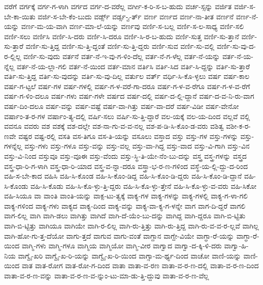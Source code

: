 {ವರೆಗೆ
ವರ್ಗಕ್ಕೆ
ವರ್ಗ-ಗ-ಳಾಗಿ
ವರ್ಗದ
ವರ್ಗ-ದ-ವರೆಲ್ಲ
ವರ್ಗೀ-ಕ-ರಿ-ಸ-ಬ-ಹುದು
ವರ್ಚ-ಸ್ಸನ್ನು
ವರ್ಜಿತ
ವರ್ಜಿ-ಸ-ಬೇ-ಕಾ-ಯಿತು
ವರ್ಜಿ-ಸ-ಬೇ-ಕೆಂ-ಬುದು
ವರ್ಡ್ಸ್
ವರ್ಡ್ಸ-್ವ-ರ್ತ್
ವರ್ಣ
ವರ್ಣದ
ವರ್ಣ-ನಾ-ತೀತ
ವರ್ಣನೆ
ವರ್ಣ-ನೆ-ಯನ್ನು
ವರ್ಣ-ಮ-ಯ-ವಾಗಿ
ವರ್ಣ-ಮಾ-ಲೆ-ಯನ್ನು
ವರ್ಣವು
ವರ್ಣಿ-ಸ-ಬಲ್ಲ
ವರ್ಣಿ-ಸ-ಲ-ಸಾಧ್ಯ
ವರ್ಣಿ-ಸಲಿ
ವರ್ಣಿ-ಸಲು
ವರ್ಣಿಸಿ
ವರ್ಣಿ-ಸಿ-ದರು
ವರ್ಣಿ-ಸಿ-ದರೂ
ವರ್ಣಿ-ಸಿ-ರ-ಬ-ಹುದು
ವರ್ಣಿ-ಸುತ್ತ
ವರ್ಣಿ-ಸು-ತ್ತಾನೆ
ವರ್ಣಿ-ಸು-ತ್ತಾರೆ
ವರ್ಣಿ-ಸು-ತ್ತಿದ್ದ
ವರ್ಣಿ-ಸು-ತ್ತಿ-ದ್ದಂತೆ
ವರ್ಣಿ-ಸು-ತ್ತಿ-ದ್ದರು
ವರ್ಣಿ-ಸುವ
ವರ್ಣಿ-ಸು-ವಲ್ಲಿ
ವರ್ಣಿ-ಸು-ವು-ದ-ರ-ಲ್ಲಿಲ್ಲ
ವರ್ಣಿ-ಸು-ವುದು
ವರ್ತನೆ
ವರ್ತ-ನೆ-ಇ-ವು-ಗ-ಳಿಂ-ದೆಲ್ಲ
ವರ್ತ-ನೆ-ಗ-ಳೆಲ್ಲ
ವರ್ತ-ನೆ-ಯನ್ನು
ವರ್ತ-ನೆ-ಯ-ನ್ನೆಲ್ಲ
ವರ್ತ-ನೆ-ಯ-ಲ್ಲಾ-ಗಲಿ
ವರ್ತ-ನೆ-ಯಿಂದ
ವರ್ತ-ಮಾನ
ವರ್ತಿಸಿ
ವರ್ತಿ-ಸಿದ
ವರ್ತಿ-ಸಿ-ದ್ದನ್ನು
ವರ್ತಿ-ಸು-ತ್ತಾರೆ
ವರ್ತಿ-ಸು-ತ್ತಿದ್ದ
ವರ್ತಿ-ಸು-ವುದನ್ನು
ವರ್ತಿ-ಸು-ವು-ದಿಲ್ಲ
ವರ್ತುಲ
ವರ್ತ್
ವರ್ಧಿ-ಸಿ-ಕೊ-ಳ್ಳಲು
ವರ್ಷ
ವರ್ಷ-ಕಾಲ
ವರ್ಷ-ಗ-ಟ್ಟಲೆ
ವರ್ಷ-ಗಳ
ವರ್ಷ-ಗಳಲ್ಲಿ
ವರ್ಷ-ಗ-ಳ-ವರೆ-ಗಾ-ದರೂ
ವರ್ಷ-ಗ-ಳ-ವ-ರೆಗೂ
ವರ್ಷ-ಗ-ಳ-ವ-ರೆಗೆ
ವರ್ಷ-ಗ-ಳಿಂ-ದಲೂ
ವರ್ಷ-ಗಳು
ವರ್ಷ-ಗಳೇ
ವರ್ಷದ
ವರ್ಷ-ದಲ್ಲಿ
ವರ್ಷ-ದ-ಲ್ಲಿ-ದ್ದಾನೆ
ವರ್ಷ-ದ-ವ-ನಿ-ರು-ವಾಗ
ವರ್ಷ-ದಿಂ-ದಲೂ
ವರ್ಷ-ವನ್ನು
ವರ್ಷ-ವಷ್ಟೆ
ವರ್ಷ-ವಾ-ಗಿತ್ತು
ವರ್ಷ-ವಾ-ದರೆ
ವರ್ಷ-ವಿಡೀ
ವರ್ಷ-ವೇನೋ
ವರ್ಷಾಂ-ತ-ರ-ಗಳ
ವರ್ಷಾಂ-ತ್ಯ-ದಲ್ಲಿ
ವರ್ಷಿ-ಸಲು
ವರ್ಷಿ-ಸು-ತ್ತಿ-ದ್ದಾರೆ
ವಲ-ಯಕ್ಕೆ
ವಲ-ಯ-ದಿಂದ
ವಲ್ಲವೆ
ವಲ್ಲಿ
ವವನೂ
ವವರು
ವಶ
ವಶಕ್ಕೆ
ವಶ-ದಲ್ಲೇ
ವಶ-ನಾ-ಗು-ವ-ವ-ನಲ್ಲ
ವಶ-ಪ-ಡಿ-ಸಿ-ಕೊಂ-ಡ-ವರು
ವಶಿತ್ವ
ವಶೀ-ಕ-ರ-ಣವೇ
ವಷ್ಟರ
ವಷ್ಟ-ರಲ್ಲಿ
ವಸತಿ
ವಸ-ತಿಗೂ
ವಸ-ತಿ-ಯನ್ನು
ವಸೂಲು
ವಸ್ತಾದ
ವಸ್ತು
ವಸ್ತು-ಗಳ
ವಸ್ತು-ಗಳನ್ನು
ವಸ್ತು-ಗಳನ್ನೆಲ್ಲ
ವಸ್ತು-ಗಳು
ವಸ್ತು-ಗಳೂ
ವಸ್ತು-ವನ್ನು
ವಸ್ತು-ವಲ್ಲ
ವಸ್ತು-ವಾ-ಗಿದ್ದ
ವಸ್ತು-ವಾದ
ವಸ್ತು-ವಿ-ಗಾಗಿ
ವಸ್ತು-ವಿನ
ವಸ್ತು-ವಿ-ನಿಂದ
ವಸ್ತುವೂ
ವಸ್ತು-ವೂಈ
ವಸ್ತು-ವೆಂದು
ವಸ್ತು-ಸ್ಥಿ-ತಿ-ಯೇ-ನೆಂ-ಬು-ದನ್ನು
ವಸ್ತ್ರ
ವಸ್ತ್ರ-ಗಳನ್ನು
ವಸ್ತ್ರದ
ವಸ್ತ್ರ-ಧಾ-ರಿ-ಗ-ಳಾಗಿ
ವಸ್ತ್ರ-ಧಾ-ರಿ-ಯಾದ
ವಸ್ತ್ರ-ವ-ನ್ನಾ-ದರೂ
ವಸ್ತ್ರಾ-ಭ-ರ-ಣ-ಗಳಿಂದ
ವಸ್ಥೆ-ಯ-ಲ್ಲಿ-ದ್ದು-ದ-ರಿಂದ
ವಹಿ-ಸ-ಬೇ-ಕಾದ
ವಹಿಸಿ
ವಹಿ-ಸಿ-ಕೊಂಡ
ವಹಿ-ಸಿ-ಕೊಂ-ಡಿದ್ದ
ವಹಿ-ಸಿ-ಕೊಂ-ಡಿ-ದ್ದರು
ವಹಿ-ಸಿ-ಕೊಂ-ಡಿ-ದ್ದಾನೆ
ವಹಿ-ಸಿ-ಕೊಂಡು
ವಹಿ-ಸಿ-ಕೊಡು
ವಹಿ-ಸಿ-ಕೊ-ಳ್ಳು-ತ್ತಿ-ದ್ದರು
ವಹಿ-ಸಿ-ಕೊ-ಳ್ಳು-ತ್ತೇನೆ
ವಹಿ-ಸಿ-ಕೊ-ಳ್ಳು-ವ-ವರು
ವಹಿ-ಸಿಕೋ
ವಹಿ-ಸಿಯೂ
ವಾ
ವಾಂತಿ
ವಾಂತಿ-ಯನ್ನು
ವಾಕ್ಪ-ಟು-ತ್ವಕ್ಕೆ
ವಾಕ್ಯ-ಗಳ
ವಾಕ್ಯ-ಗಳನ್ನು
ವಾಕ್ಯ-ಗಳಲ್ಲಿ
ವಾಕ್ಯ-ಗ-ಳಾ-ಗಲಿ
ವಾಕ್ಯ-ಗಳಿಂದ
ವಾಕ್ಯ-ಗಳು
ವಾಕ್ಯದ
ವಾಕ್ಯ-ದಿಂದ
ವಾಕ್ಯ-ವನ್ನು
ವಾಕ್ಯ-ವಾ-ಕ್ಯ-ಗ-ಳನ್ನೇ
ವಾಗ
ವಾಗ-ದಿ-ದ್ದರೆ
ವಾಗಲಿ
ವಾಗ-ಲಿಲ್ಲ
ವಾಗಿ
ವಾಗಿ-ಡಲು
ವಾಗಿತ್ತು
ವಾಗಿದೆ
ವಾಗಿ-ದೆ-ಯೆಂ-ಬು-ದನ್ನು
ವಾಗಿದ್ದ
ವಾಗಿ-ದ್ದರೂ
ವಾಗಿ-ಬಿ-ಟ್ಟಿತು
ವಾಗಿ-ಬಿ-ಟ್ಟಿತ್ತು
ವಾಗಿಯೂ
ವಾಗಿಯೇ
ವಾಗಿ-ರ-ಲಿಲ್ಲ
ವಾಗಿ-ರು-ತ್ತಿತ್ತು
ವಾಗಿ-ರು-ತ್ತಿದ್ದ
ವಾಗಿ-ರು-ವ-ವ-ರ-ಲ್ಲವೆ
ವಾಗಿಲ್ಲ
ವಾಗಿ-ಹೋ-ಗು-ತ್ತ-ದೆಯೋ
ವಾಗು-ತ್ತದೆ
ವಾಗುವ
ವಾಗು-ವಂತೆ
ವಾಗ್ದಾನ
ವಾಗ್ದೇ-ವಿಯೇ
ವಾಗ್ಧಾ-ರೆ-ಯನ್ನು
ವಾಗ್ಧಾ-ರೆ-ಯಿಂದ
ವಾಗ್ಮಿ-ಗಳು
ವಾಗ್ಮಿ-ಗಳೂ
ವಾಗ್ಮಿಯ
ವಾಗ್ಮಿಯೋ
ವಾಗ್ಮಿ-ವೀರ
ವಾಗ್ವಾದ
ವಾಗ್ವಾ-ದ-ಕ್ಕಿ-ಳಿ-ದರು
ವಾಗ್ವಾ-ಹಿ-ನಿಯ
ವಾಗ್ವೈ-ಖರಿ
ವಾಗ್ವೈ-ಖ-ರಿ-ಯನ್ನು
ವಾಗ್ವೈ-ಖ-ರಿ-ಯಿಂದ
ವಾಗ್ಸಾ-ಮ-ರ್ಥ್ಯ-ದಿಂದ
ವಾಚೋ
ವಾಣಿ-ಯನ್ನು
ವಾಣಿ-ಯಿಂದ
ವಾತ
ವಾತ-ರೋಗ
ವಾತ-ರೋ-ಗ-ದಿಂದ
ವಾತಾ
ವಾತಾ-ವ-ರಣ
ವಾತಾ-ವ-ರ-ಣ-ದಲ್ಲಿ
ವಾತಾ-ವ-ರ-ಣ-ದಿಂದ
ವಾತಾ-ವ-ರ-ಣ-ವನ್ನು
ವಾತಾ-ವ-ರ-ಣ-ವ-ನ್ನುಂ-ಟು-ಮಾ-ಡು-ತ್ತಿ-ದ್ದುವು
ವಾತಾ-ವ-ರ-ಣ-ವೆಲ್ಲ
}
